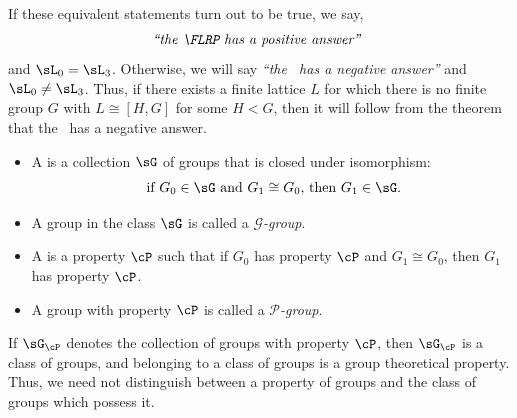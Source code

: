\begin{frame}[fragile,label=LocalStructureNegAnswer]{}
If these equivalent statements turn out to be true, we say,
\[\text{\emph{``the \FLRP\ has a positive answer''}  }\] and $\sL_0 = \sL_3$.
Otherwise, we will say 
\emph{``the \FLRP\ has a negative answer''} 
and $\sL_0 \neq \sL_3$.
\vskip4mm Thus, if there exists a finite lattice $L$ for which 
there is no finite group $G$ with $L \cong [H,G]$ for some $H< G$,
then it will follow from the theorem that the \FLRP\ has a negative answer.
\end{frame}








\begin{frame}[label=ClassProp]{}
  \begin{itemize}
  \item  A  is a
    collection $\sG$ of groups that is closed under isomorphism:
    \[
    \text{ if $G_0\in \sG$ and  $G_1\cong G_0$, then $G_1\in \sG$.}
    \]
\vskip5pt
\item[] A group in the class $\sG$ is called a \emph{$\mathscr{G}$-group}.
  \vskip14mm
  \item A 
    is a property $\cP$ such that if $G_0$ has property $\cP$ and
    $G_1\cong G_0$, then $G_1$ has property $\cP$.
\vskip5pt
\item[] A group with property $\cP$ is called a \emph{$\mathcal{P}$-group}.  
  \end{itemize}
\end{frame}

\begin{frame}[label=ClassProp]{}
If $\sG_{\cP}$ denotes the collection of groups with property $\cP$, then
  $\sG_{\cP}$  is a class of groups, and belonging to a class of groups is a
  group theoretical property. \\[6pt]
Thus, we need not distinguish between a property of groups and the
  class of groups which possess it.
\vskip2cm
\end{frame}


